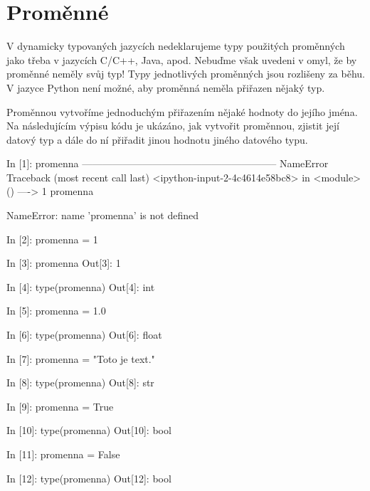 \section{Proměnné}%




V dynamicky typovaných jazycích nedeklarujeme typy použitých proměnných jako třeba v jazycích C/C++, Java, apod.
Nebuďme však uvedeni v omyl, že by proměnné neměly svůj typ! Typy jednotlivých proměnných jsou rozlišeny za běhu.
V jazyce Python není možné, aby proměnná neměla přiřazen nějaký typ.

Proměnnou vytvoříme jednoduchým přiřazením nějaké hodnoty do jejího jména. Na následujícím výpisu kódu je ukázáno,
jak vytvořit proměnnou, zjistit její datový typ a dále do ní přiřadit jinou hodnotu jiného datového typu.

\begin{python}
In [1]: promenna
-----------------------------------------------------------
NameError                 Traceback (most recent call last)
<ipython-input-2-4c4614e58bc8> in <module>()
----> 1 promenna

NameError: name 'promenna' is not defined

In [2]: promenna = 1

In [3]: promenna
Out[3]: 1

In [4]: type(promenna)
Out[4]: int

In [5]: promenna = 1.0

In [6]: type(promenna)
Out[6]: float

In [7]: promenna = "Toto je text."

In [8]: type(promenna)
Out[8]: str

In [9]: promenna = True

In [10]: type(promenna)
Out[10]: bool

In [11]: promenna = False

In [12]: type(promenna)
Out[12]: bool
\end{python}

